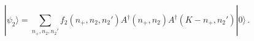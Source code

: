 \begin{equation}
|\psi_2\rangle=\sum_{n_+, n_2,n_2'}
f_2(n_+,n_2,n_2')A^\dagger(n_+,n_2)A^\dagger(K-n_+,n_2')|0\rangle\,.
\end{equation}

